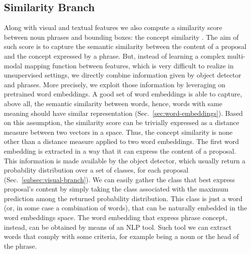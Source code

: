 \subsection{Similarity Branch}

Along with visual and textual features we also compute a similarity
score between noun phrases and bounding boxes: the concept similarity
\cite{wang2019phrase}. The aim of such score is to capture the
semantic similarity between the content of a proposal and the concept
expressed by a phrase. But, instead of learning a complex multi-modal
mapping function between features, which is very difficult to realize
in unsupervised settings, we directly combine information given by
object detector and phrases. More precisely, we exploit those
information by leveraging on pretrained word embeddings. A good set of
word embeddings is able to capture, above all, the semantic similarity
between words, hence, words with same meaning should have similar
representation (Sec.~\ref{sec:word-embeddings}). Based on this
assumption, the similarity score can be trivially expressed as a
distance measure between two vectors in a space. Thus, the concept
similarity is none other than a distance measure applied to two word
embeddings. The first word embedding is extracted in a way that it can
express the content of a proposal. This information is made available
by the object detector, which usually return a probability
distribution over a set of classes, for each proposal
(Sec.~\ref{subsec:visual-branch}). We can easily gather the class that
best express proposal's content by simply taking the class associated
with the maximum prediction among the returned probability
distribution. This class is just a word (or, in some case a
combination of words), that can be naturally embedded in the word
embeddings space. The word embedding that express phrase concept,
instead, can be obtained by means of an NLP tool. Such tool we can
extract words that comply with some criteria, for example being a noun
or the head of the phrase. 

